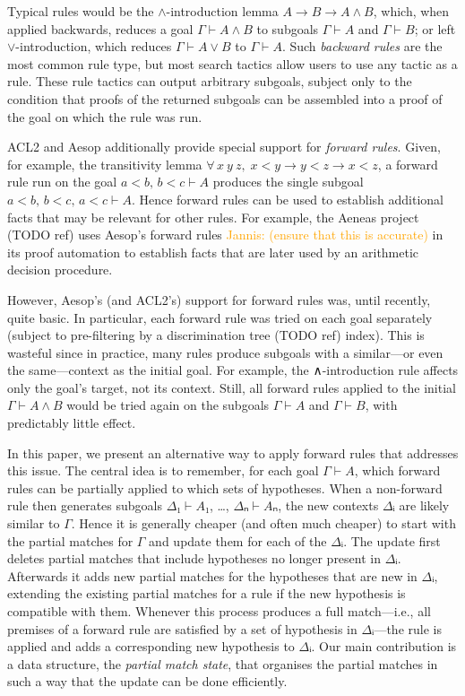 \documentclass[runningheads]{llncs}
\newcommand{\jcom}[1]{{\textcolor{orange}{Jannis: #1}} }
\newcommand{\All}[2]{\ensuremath{\forall\, #1,\; #2}}
\begin{document}
Typical rules would be the $∧$-introduction lemma $A → B → A ∧ B$, which, when applied backwards, reduces a goal $Γ ⊢ A ∧ B$ to subgoals $Γ ⊢ A$ and $Γ ⊢ B$; or left $∨$-introduction, which reduces $Γ ⊢ A ∨ B$ to $Γ ⊢ A$.
Such \emph{backward rules} are the most common rule type, but most search tactics allow users to use any tactic as a rule.
These rule tactics can output arbitrary subgoals, subject only to the condition that proofs of the returned subgoals can be assembled into a proof of the goal on which the rule was run.

ACL2 and Aesop additionally provide special support for \emph{forward rules}.
Given, for example, the transitivity lemma $\All{x~y~z}{x < y → y < z → x < z}$, a forward rule run on the goal $a < b,\, b < c ⊢ A$ produces the single subgoal $a < b,\, b < c,\, a < c ⊢ A$.
Hence forward rules can be used to establish additional facts that may be relevant for other rules.
For example, the Aeneas project (TODO ref) uses Aesop's forward rules \jcom{(ensure that this is accurate)} in its proof automation to establish facts that are later used by an arithmetic decision procedure.

However, Aesop's (and ACL2's) support for forward rules was, until recently, quite basic.
In particular, each forward rule was tried on each goal separately (subject to pre-filtering by a discrimination tree (TODO ref) index).
This is wasteful since in practice, many rules produce subgoals with a similar---or even the same---context as the initial goal.
For example, the ∧-introduction rule affects only the goal's target, not its context.
Still, all forward rules applied to the initial $Γ ⊢ A ∧ B$ would be tried again on the subgoals $Γ ⊢ A$ and $Γ ⊢ B$, with predictably little effect.

In this paper, we present an alternative way to apply forward rules that addresses this issue.
The central idea is to remember, for each goal $Γ ⊢ A$, which forward rules can be partially applied to which sets of hypotheses.
When a non-forward rule then generates subgoals $Δ₁ ⊢ A₁$, \dots, $Δₙ ⊢ Aₙ$, the new contexts $Δᵢ$ are likely similar to $Γ$.
Hence it is generally cheaper (and often much cheaper) to start with the partial matches for $Γ$ and update them for each of the $Δᵢ$.
The update first deletes partial matches that include hypotheses no longer present in $Δᵢ$.
Afterwards it adds new partial matches for the hypotheses that are new in $Δᵢ$, extending the existing partial matches for a rule if the new hypothesis is compatible with them.
Whenever this process produces a full match---i.e., all premises of a forward rule are satisfied by a set of hypothesis in $Δᵢ$---the rule is applied and adds a corresponding new hypothesis to $Δᵢ$.
Our main contribution is a data structure, the \emph{partial match state}, that organises the partial matches in such a way that the update can be done efficiently.
\end{document}
